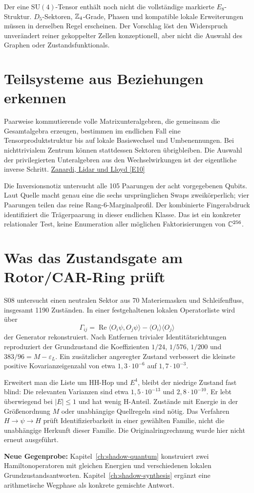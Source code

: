 Der eine $\mathrm{SU}(4)$-Tensor enthält noch nicht die vollständige markierte $E_8$-Struktur. $D_5$-Sektoren, $\mathbb Z_4$-Grade, Phasen und kompatible lokale Erweiterungen müssen in derselben Regel erscheinen. Der Vorschlag löst den Widerspruch unverändert reiner gekoppelter Zellen konzeptionell, aber nicht die Auswahl des Graphen oder Zustandsfunktionals.

\section{Teilsysteme aus Beziehungen erkennen}


Paarweise kommutierende volle Matrixunteralgebren, die gemeinsam die Gesamtalgebra erzeugen, bestimmen im endlichen Fall eine Tensorproduktstruktur bis auf lokale Basiswechsel und Umbenennungen. Bei nichttrivialem Zentrum können stattdessen Sektoren übrigbleiben. Die Auswahl der privilegierten Unteralgebren aus den Wechselwirkungen ist der eigentliche inverse Schritt. \href{https://arxiv.org/abs/quant-ph/0308043}{Zanardi, Lidar und Lloyd [E10]}

Die Inversionsnotiz untersucht alle 105 Paarungen der acht vorgegebenen Qubits. Laut Quelle macht genau eine die sechs ursprünglichen Swaps zweikörperlich; vier Paarungen teilen das reine Rang-6-Marginalprofil. Der kombinierte Fingerabdruck identifiziert die Trägerpaarung in dieser endlichen Klasse. Das ist ein konkreter relationaler Test, keine Enumeration aller möglichen Faktorisierungen von $\mathbb C^{256}$.

\section{Was das Zustandsgate am Rotor/CAR-Ring prüft}
S08 untersucht einen neutralen Sektor aus 70 Materiemasken und Schleifenfluss, insgesamt 1190 Zuständen. In einer festgehaltenen lokalen Operatorliste wird über
\begin{equation}
\Gamma_{ij}=\operatorname{Re}\langle O_i\psi,O_j\psi\rangle
-\langle O_i\rangle\langle O_j\rangle
\end{equation}
der Generator rekonstruiert. Nach Entfernen trivialer Identitätsrichtungen reproduziert der Grundzustand die Koeffizienten $1/24$, $1/576$, $1/200$ und $383/96=M-\varepsilon_L$. Ein zusätzlicher angeregter Zustand verbessert die kleinste positive Kovarianzeigenzahl von etwa $1{,}3\cdot10^{-6}$ auf $1{,}7\cdot10^{-3}$.

Erweitert man die Liste um HH-Hop und $E^4$, bleibt der niedrige Zustand fast blind: Die relevanten Varianzen sind etwa $1{,}5\cdot10^{-13}$ und $2{,}8\cdot10^{-10}$. Er lebt überwiegend bei $|E|\le1$ und hat wenig H-Anteil. Zustände mit Energie in der Größenordnung $M$ oder unabhängige Quellregeln sind nötig. Das Verfahren $H\to\psi\to H$ prüft Identifizierbarkeit in einer gewählten Familie, nicht die unabhängige Herkunft dieser Familie. Die Originalringrechnung wurde hier nicht erneut ausgeführt.

\par\noindent\textbf{Neue Gegenprobe:} Kapitel~\ref{ch:shadow-quantum} konstruiert zwei Hamiltonoperatoren mit gleichen Energien und verschiedenen lokalen Grundzustandsantworten. Kapitel~\ref{ch:shadow-synthesis} ergänzt eine arithmetische Wegphase als konkrete gemischte Antwort.
